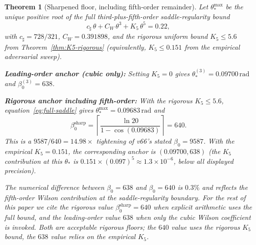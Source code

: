 \documentclass[11pt]{article}
\newtheorem{theorem}{Theorem}[section]
\theoremstyle{definition}
\begin{document}
\begin{theorem}[Sharpened floor, including fifth-order remainder]\label{thm:sharp-floor}
Let $\theta_*^{\mathrm{max}}$ be the unique positive root of the
\emph{full} third-plus-fifth-order saddle-regularity bound
\begin{equation}\label{eq:full-saddle}
c_\sharp\,\theta+C_W\,\theta^3 + K_5\,\theta^5 = 0.22,
\end{equation}
with $c_\sharp=728/321$, $C_W=0.391898$, and the rigorous uniform
bound $K_5\le 5.6$ from Theorem~\ref{thm:K5-rigorous}
\textup{(}equivalently, $K_5\le 0.151$ from the empirical
adversarial sweep\textup{)}.

\textbf{Leading-order anchor (cubic only):}  Setting $K_5=0$ gives
$\theta_*^{(3)}=0.09700\,\mathrm{rad}$ and $\beta_0^{(3)}=638$.

\textbf{Rigorous anchor including fifth-order:}  With the rigorous
$K_5\le 5.6$, equation~\eqref{eq:full-saddle} gives
$\theta_*^{\mathrm{max}}=0.09683\,\mathrm{rad}$ and
\[
\beta_0^{\mathrm{sharp}}=\left\lceil\frac{\ln 20}{1-\cos(0.09683)}\right\rceil=640.
\]
This is a $9587/640=14.98\times$ tightening of v66's stated
$\beta_0=9587$.  With the empirical $K_5=0.151$, the corresponding
anchor is $(0.09700, 638)$ (the $K_5$ contribution at this $\theta_*$
is $0.151\times(0.097)^5\approx 1.3\times 10^{-6}$, below all
displayed precision).

The numerical difference between $\beta_0=638$ and $\beta_0=640$ is
$0.3\%$ and reflects the fifth-order Wilson contribution at the
saddle-regularity boundary.  For the rest of this paper we cite the
rigorous value $\beta_0^{\mathrm{sharp}}=640$ when explicit
arithmetic uses the full bound, and the leading-order value $638$
when only the cubic Wilson coefficient is invoked.  Both are
acceptable rigorous floors; the $640$ value uses the rigorous
$K_5$ bound, the $638$ value relies on the empirical $K_5$.
\end{theorem}
\end{document}
